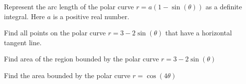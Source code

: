 \documentclass[12pt,fleqn]{exam}
\begin{document}
\begin{questions}
\begin{solution}%
\end{solution}

\newpage 
\question Represent the arc length of the polar curve $r = a (1-\sin(\theta))$
as a definite integral. Here $a$ is a positive real number.

\begin{solution}[3.5in]
\end{solution}

\question Find all points on the polar curve $r = 3 - 2 \sin(\theta)$
that have a horizontal tangent line.

\begin{solution}%
\end{solution}

\newpage 
\question Find area of the region bounded by the  polar curve 
$r = 3 - 2 \sin(\theta)$

\begin{solution}[3.5in]
\end{solution}

\question Find the area bounded by the polar curve $r = \cos(4 \theta)$
\begin{solution}[3.5in]
\end{solution}




\end{questions}

    
\end{document}

